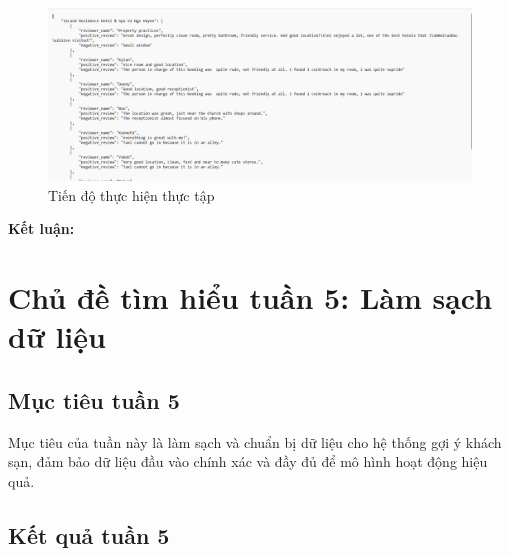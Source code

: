 \begin{enumerate}
\begin{enumerate}
        \begin{figure}[H] %
        \centering
        \includegraphics[width=1.0\linewidth]{Figures/1.4.png}
        \caption{Tiến độ thực hiện thực tập}
        \label{fig:iot}
        \end{figure}
        
    \end{enumerate}
\end{enumerate}


\textbf{Kết luận:} 

\section{Chủ đề tìm hiểu tuần 5: Làm sạch dữ liệu}

\subsection{Mục tiêu tuần 5}
Mục tiêu của tuần này là làm sạch và chuẩn bị dữ liệu cho hệ thống gợi ý khách sạn, đảm bảo dữ liệu đầu vào chính xác và đầy đủ để mô hình hoạt động hiệu quả.

\subsection{Kết quả tuần 5}

